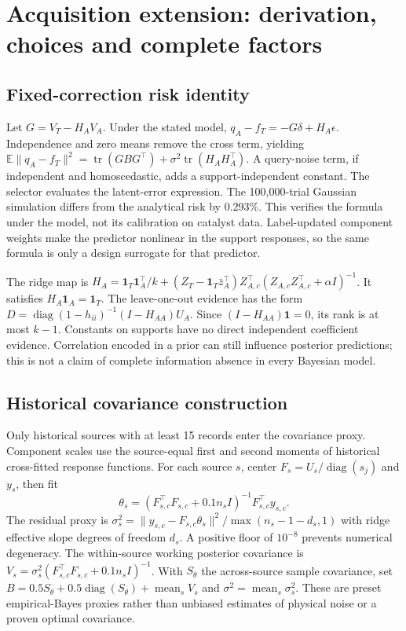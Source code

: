 \documentclass[11pt]{article}
\begin{document}
\clearpage
\section{Acquisition extension: derivation, choices and complete factors}
\subsection{Fixed-correction risk identity}
Let $G=V_T-H_AV_A$. Under the stated model, $q_A-f_T=-G\delta+H_A\epsilon$. Independence and zero means remove the cross term, yielding $\mathbb E\|q_A-f_T\|^2=\operatorname{tr}(GBG^\top)+\sigma^2\operatorname{tr}(H_AH_A^\top)$. A query-noise term, if independent and homoscedastic, adds a support-independent constant. The selector evaluates the latent-error expression. The 100,000-trial Gaussian simulation differs from the analytical risk by 0.293\%. This verifies the formula under the model, not its calibration on catalyst data. Label-updated component weights make the predictor nonlinear in the support responses, so the same formula is only a design surrogate for that predictor.

The ridge map is $H_A=\mathbf1_T\mathbf1_A^\top/k+(Z_T-\mathbf1_T\bar z_A^\top)Z_{A,c}^\top(Z_{A,c}Z_{A,c}^\top+\alpha I)^{-1}$. It satisfies $H_A\mathbf1_A=\mathbf1_T$. The leave-one-out evidence has the form $D=\operatorname{diag}(1-h_{ii})^{-1}(I-H_{AA})U_A$. Since $(I-H_{AA})\mathbf1=0$, its rank is at most $k-1$. Constants on supports have no direct independent coefficient evidence. Correlation encoded in a prior can still influence posterior predictions; this is not a claim of complete information absence in every Bayesian model.

\subsection{Historical covariance construction}
Only historical sources with at least 15 records enter the covariance proxy. Component scales use the source-equal first and second moments of historical cross-fitted response functions. For each source $s$, center $F_s=U_s/\operatorname{diag}(s_j)$ and $y_s$, then fit
\[
\theta_s=(F_{s,c}^\top F_{s,c}+0.1n_sI)^{-1}F_{s,c}^\top y_{s,c}.
\]
The residual proxy is $\sigma_s^2=\|y_{s,c}-F_{s,c}\theta_s\|^2/\max(n_s-1-d_s,1)$ with ridge effective slope degrees of freedom $d_s$. A positive floor of $10^{-8}$ prevents numerical degeneracy. The within-source working posterior covariance is $V_s=\sigma_s^2(F_{s,c}^\top F_{s,c}+0.1n_sI)^{-1}$. With $S_\theta$ the across-source sample covariance, set $B=0.5S_\theta+0.5\operatorname{diag}(S_\theta)+\operatorname{mean}_sV_s$ and $\sigma^2=\operatorname{mean}_s\sigma_s^2$. These are preset empirical-Bayes proxies rather than unbiased estimates of physical noise or a proven optimal covariance.
\end{document}
